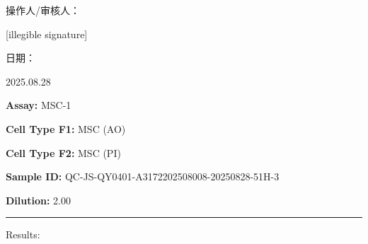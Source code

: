 \documentclass[UTF8,10pt,a4paper,fontset=fandol]{ctexart}
\newcommand{\fieldvalue}[1]{#1}
\newcommand{\handwritten}[1]{#1}
\begin{document}
\vfill

\noindent
操作人/审核人：

\fieldvalue{\handwritten{[illegible signature]}}

\hfill
日期：

\fieldvalue{\handwritten{2025.08.28}}

\newpage

\noindent\textbf{Assay:}
\fieldvalue{MSC-1}

\medskip
\noindent\textbf{Cell Type F1:}
\fieldvalue{MSC (AO)}

\noindent\textbf{Cell Type F2:}
\fieldvalue{MSC (PI)}

\medskip
\noindent\textbf{Sample ID:}
\fieldvalue{QC-JS-QY0401-A3172202508008-20250828-51H-3}

\noindent\textbf{Dilution:}
\fieldvalue{2.00}

\medskip
\noindent\rule{\textwidth}{0.4pt}

\noindent Results:
\end{document}
